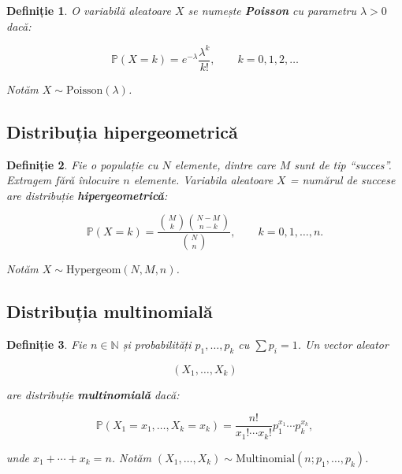 \documentclass[12pt]{article}
\theoremstyle{plain}
\newtheorem{definition}{Definiție}
\begin{document}
\begin{definition}
O variabilă aleatoare $X$ se numește \textbf{Poisson} cu parametru $\lambda > 0$ dacă:


\[
\mathbb{P}(X = k) = e^{-\lambda} \frac{\lambda^k}{k!},
\qquad k = 0,1,2,\dots
\]


Notăm $X \sim \mathrm{Poisson}(\lambda)$.
\end{definition}

\subsection{Distribuția hipergeometrică}

\begin{definition}
Fie o populație cu $N$ elemente, dintre care $M$ sunt de tip ``succes''.
Extragem fără înlocuire $n$ elemente.
Variabila aleatoare $X$ = numărul de succese are distribuție \textbf{hipergeometrică}:


\[
\mathbb{P}(X = k)
= \frac{\binom{M}{k} \binom{N-M}{n-k}}{\binom{N}{n}},
\qquad k = 0,1,\dots,n.
\]


Notăm $X \sim \mathrm{Hypergeom}(N,M,n)$.
\end{definition}

\subsection{Distribuția multinomială}

\begin{definition}
Fie $n \in \mathbb{N}$ și probabilități $p_1,\dots,p_k$ cu $\sum p_i = 1$.
Un vector aleator


\[
(X_1,\dots,X_k)
\]


are distribuție \textbf{multinomială} dacă:


\[
\mathbb{P}(X_1 = x_1, \dots, X_k = x_k)
= \frac{n!}{x_1! \cdots x_k!} p_1^{x_1} \cdots p_k^{x_k},
\]


unde $x_1 + \cdots + x_k = n$.
Notăm $(X_1,\dots,X_k) \sim \mathrm{Multinomial}(n; p_1,\dots,p_k)$.
\end{definition}
\end{document}
